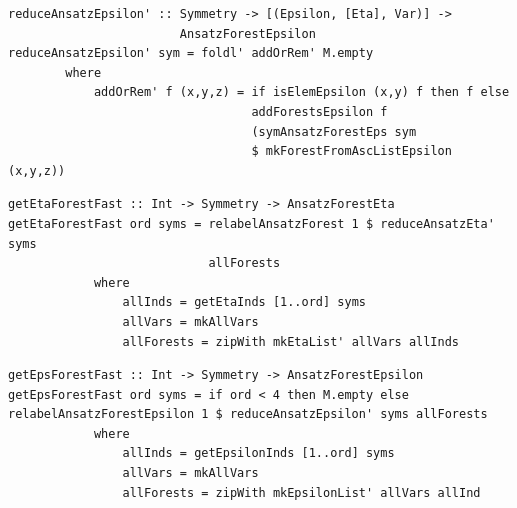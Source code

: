 \documentclass[a4paper,12pt, DIV=14, BCOR=5mm, twoside, headsepline]{scrbook}
\begin{document}
\begin{samepage}
\begin{verbatim}
reduceAnsatzEpsilon' :: Symmetry -> [(Epsilon, [Eta], Var)] ->
                        AnsatzForestEpsilon
reduceAnsatzEpsilon' sym = foldl' addOrRem' M.empty
        where
            addOrRem' f (x,y,z) = if isElemEpsilon (x,y) f then f else
                                  addForestsEpsilon f 
                                  (symAnsatzForestEps sym 
                                  $ mkForestFromAscListEpsilon (x,y,z))  
\end{verbatim} 
\end{samepage}

\begin{samepage}
\begin{verbatim}
getEtaForestFast :: Int -> Symmetry -> AnsatzForestEta
getEtaForestFast ord syms = relabelAnsatzForest 1 $ reduceAnsatzEta' syms 
                            allForests
            where
                allInds = getEtaInds [1..ord] syms
                allVars = mkAllVars
                allForests = zipWith mkEtaList' allVars allInds
\end{verbatim} 
\end{samepage}

\begin{samepage}
\begin{verbatim}
getEpsForestFast :: Int -> Symmetry -> AnsatzForestEpsilon
getEpsForestFast ord syms = if ord < 4 then M.empty else
relabelAnsatzForestEpsilon 1 $ reduceAnsatzEpsilon' syms allForests
            where
                allInds = getEpsilonInds [1..ord] syms
                allVars = mkAllVars
                allForests = zipWith mkEpsilonList' allVars allInd
\end{verbatim} 
\end{samepage}
\end{document}
